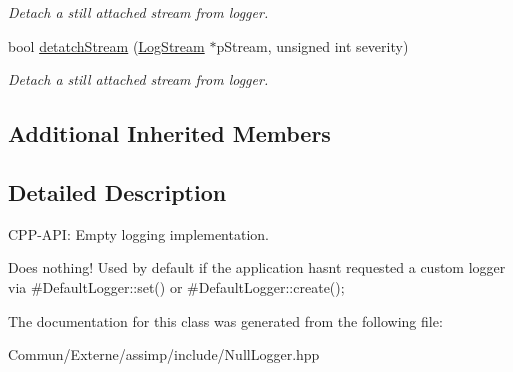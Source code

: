 \begin{DoxyCompactItemize}
\begin{DoxyCompactList}\small\item\em Detach a still attached stream from logger. \end{DoxyCompactList}\item 
bool \hyperlink{class_assimp_1_1_null_logger_ab49b14a0045aab73b813a448b5aa77b4}{detatch\+Stream} (\hyperlink{class_assimp_1_1_log_stream}{Log\+Stream} $\ast$p\+Stream, unsigned int severity)\hypertarget{class_assimp_1_1_null_logger_ab49b14a0045aab73b813a448b5aa77b4}{}\label{class_assimp_1_1_null_logger_ab49b14a0045aab73b813a448b5aa77b4}

\begin{DoxyCompactList}\small\item\em Detach a still attached stream from logger. \end{DoxyCompactList}\end{DoxyCompactItemize}
\subsection*{Additional Inherited Members}


\subsection{Detailed Description}
C\+P\+P-\/\+A\+PI\+: Empty logging implementation. 

Does nothing! Used by default if the application hasn\textquotesingle{}t requested a custom logger via \#\+Default\+Logger\+::set() or \#\+Default\+Logger\+::create(); 

The documentation for this class was generated from the following file\+:\begin{DoxyCompactItemize}
\item 
Commun/\+Externe/assimp/include/Null\+Logger.\+hpp\end{DoxyCompactItemize}
